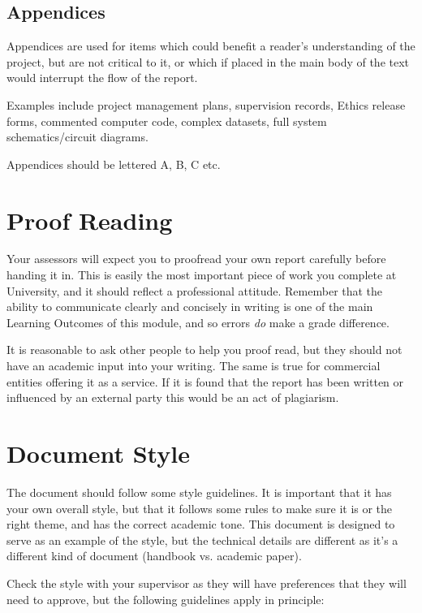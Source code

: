 \subsection{Appendices}

Appendices are used for items which could benefit a reader’s understanding of the project, but are not critical to it, or which if placed in the main body of the text would interrupt the flow of the report.

Examples include project management plans, supervision records, Ethics release forms, commented computer code, complex datasets, full system schematics/circuit diagrams.

Appendices should be lettered A, B, C etc.


\section{Proof Reading}

Your assessors will expect you to proofread your own report carefully before handing it in. This is easily the most important piece of work you complete at University, and it should reflect a professional attitude. Remember that the ability to communicate clearly and concisely in writing is one of the main Learning Outcomes of this module, and so errors \textit{do} make a grade difference. 

It is reasonable to ask other people to help you proof read, but they should not have an academic input into your writing. The same is true for commercial entities offering it as a service. If it is found that the report has been written or influenced by an external party this would be an act of plagiarism.

\section{Document Style}

The document should follow some style guidelines. It is important that it has your own overall style, but that it follows some rules to make sure it is or the right theme, and has the correct academic tone. This document is designed to serve as an example of the style, but the technical details are different as it's a different kind of document (handbook vs. academic paper). 

Check the style with your supervisor as they will have preferences that they will need to approve, but the following guidelines apply in principle:

